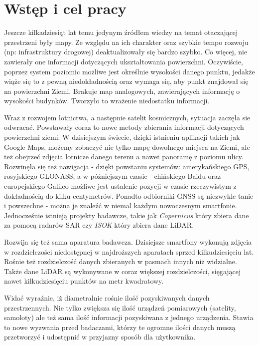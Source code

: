 \chapter{Wst\k{e}p i cel pracy}

Jeszcze kilkadziesiąt lat temu jedynym źródłem wiedzy na temat otaczającej przestrzeni były mapy.
Ze względu na ich charakter oraz szybkie tempo rozwoju (np: infrastruktury drogowej) deaktualizowały
się bardzo szybko. Co więcej, nie zawierały one informacji dotyczących ukształtowania powierzchni.
Oczywiście, poprzez system poziomic możliwe jest określnie wysokości danego punktu, jedakże wiąże się to
z pewną niedokładnością oraz wymaga się, aby punkt znajdował się na powierzchni Ziemi. Brakuje
map analogowych, zawierających informację o wysokości budynków. Tworzyło to wrażenie niedostatku informacji.

Wraz z rozwojem lotnictwa, a następnie satelit kosmicznych, sytuacja zaczęła sie odwracać. Powstawały coraz to
nowe metody zbierania informacji dotyczących powierzchni ziemi. W dzisiejszym świecie, dzięki istnieniu aplikacji
takich jak Google Maps, możemy zobaczyć nie tylko mapę dowolnego miejsca na Ziemi,
ale też obejrzeć zdjęcia lotnicze danego terenu a nawet panoramę z poziomu ulicy. Rozwinęła się też nawigacja - dzięki powstaniu
systemów: amerykańskiego GPS\cite{website:gps}, rosyjskiego GLONASS\cite{website:glonass}, a w późniejszym czasie - chińskiego Baidu oraz europejskiego Galileo możliwe
jest ustalenie pozycji w czasie rzeczywistym z dokładnością do kilku centymetrów. Ponadto odbiorniki GNSS są niezwykle tanie i
powszechne - można je znaleźć w niemal każdym nowoczesnym smartfonie.
Jednocześnie istnieją projekty badawcze, takie jak
\textit{Copernicus}\cite{webiste:copernicus} który zbiera dane za pomocą radarów SAR czy \textit{ISOK}\cite{website:isok} który zbiera
dane LiDAR.

Rozwija się też sama aparatura badawcza. Dzisiejsze smartfony wykonują zdjęcia w rozdzielczości niedostępnej w najdroższych
aparatach sprzed kilkudziesięciu lat. Rośnie też rozdzielczość danych zbieranych w pasmach innych niż widzialne.
Także dane LiDAR są wykonywane w coraz większej rozdzielczości, sięgającej nawet kilkudziesięciu punktów na metr kwadratowy.

Widać wyraźnie, iż diametralnie rośnie ilość pozyskiwanych danych przestrzennych. Nie tylko zwiększa się ilość urządzeń
pomiarowych (satelity, samoloty) ale też sama ilość informacji pozyskiwana z jednego urządzenia. Stawia to nowe wyzwania przed badaczami,
którzy te ogromne ilości danych muszą przetworzyć i udostępnić w przyjazny sposób dla użytkownika.

